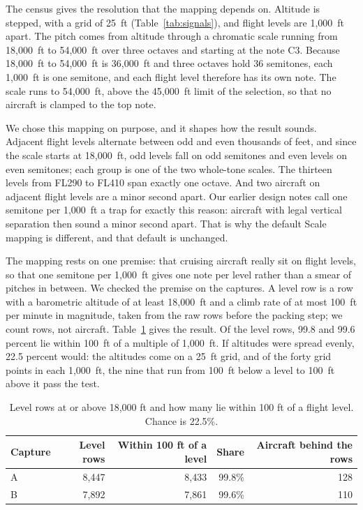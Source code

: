 \documentclass[11pt,letterpaper]{article}
\begin{document}
The census gives the resolution that the mapping depends on. Altitude is stepped, with a grid of 25~ft (Table~\ref{tab:signals}), and flight levels are 1,000~ft apart. The pitch comes from altitude through a chromatic scale running from 18,000~ft to 54,000~ft over three octaves and starting at the note C3. Because 18,000~ft to 54,000~ft is 36,000~ft and three octaves hold 36 semitones, each 1,000~ft is one semitone, and each flight level therefore has its own note. The scale runs to 54,000~ft, above the 45,000~ft limit of the selection, so that no aircraft is clamped to the top note.

We chose this mapping on purpose, and it shapes how the result sounds. Adjacent flight levels alternate between odd and even thousands of feet, and since the scale starts at 18,000~ft, odd levels fall on odd semitones and even levels on even semitones; each group is one of the two whole-tone scales. The thirteen levels from FL290 to FL410 span exactly one octave. And two aircraft on adjacent flight levels are a minor second apart. Our earlier design notes call one semitone per 1,000~ft a trap for exactly this reason: aircraft with legal vertical separation then sound a minor second apart. That is why the default Scale mapping is different, and that default is unchanged.

The mapping rests on one premise: that cruising aircraft really sit on flight levels, so that one semitone per 1,000~ft gives one note per level rather than a smear of pitches in between. We checked the premise on the captures. A level row is a row with a barometric altitude of at least 18,000~ft and a climb rate of at most 100~ft per minute in magnitude, taken from the raw rows before the packing step; we count rows, not aircraft. Table~\ref{tab:levels} gives the result. Of the level rows, 99.8 and 99.6 percent lie within 100~ft of a multiple of 1,000~ft. If altitudes were spread evenly, 22.5 percent would: the altitudes come on a 25~ft grid, and of the forty grid points in each 1,000~ft, the nine that run from 100~ft below a level to 100~ft above it pass the test.

\begin{table}[h]
\centering\small
\begin{tabular}{@{}lrrrr@{}}
\toprule
Capture & Level rows & Within 100 ft of a level & Share & Aircraft behind the rows\\
\midrule
A & 8,447 & 8,433 & 99.8\% & 128\\
B & 7,892 & 7,861 & 99.6\% & 110\\
\bottomrule
\end{tabular}
\caption{Level rows at or above 18,000 ft and how many lie within 100 ft of a flight level. Chance is 22.5\%.}
\label{tab:levels}
\end{table}
\end{document}
